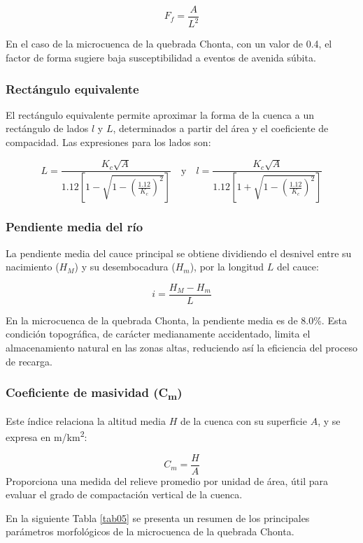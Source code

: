 \[
F_f = \frac{A}{L^2}
\]

En el caso de la microcuenca de la quebrada Chonta, con un valor de 0.4, el
factor de forma sugiere baja susceptibilidad a eventos de avenida súbita.

\subsubsection*{Rectángulo equivalente}
El rectángulo equivalente permite aproximar la forma de la cuenca a un
rectángulo de lados $l$ y $L$, determinados a partir del área y el coeficiente
de compacidad. Las expresiones para los lados son:

\[
L = \frac{K_c \sqrt{A}}{1.12 \left[1 - \sqrt{1 - \left(\frac{1.12}{K_c}\right)^2}\right]}
\quad \text{y} \quad
l = \frac{K_c \sqrt{A}}{1.12 \left[1 + \sqrt{1 - \left(\frac{1.12}{K_c}\right)^2}\right]}
\]

\subsubsection*{Pendiente media del río}
La pendiente media del cauce principal se obtiene dividiendo el desnivel entre
su nacimiento ($H_M$) y su desembocadura ($H_m$), por la longitud $L$ del cauce:

\[
i = \frac{H_M - H_m}{L}
\]

En la microcuenca de la quebrada Chonta, la pendiente media es de 8.0\%. Esta
condición topográfica, de carácter medianamente accidentado, limita el
almacenamiento natural en las zonas altas, reduciendo así la eficiencia del
proceso de recarga.

\subsubsection*{Coeficiente de masividad (C\textsubscript{m})} Este índice
relaciona la altitud media $H$ de la cuenca con su superficie $A$, y se expresa
en m/km\textsuperscript{2}:

\[
C_m = \frac{H}{A}
\]
Proporciona una medida del relieve promedio por unidad de área, útil para
evaluar el grado de compactación vertical de la cuenca.

En la siguiente Tabla \ref{tab05} se presenta un resumen de los principales
parámetros morfológicos de la microcuenca de la quebrada Chonta. 

